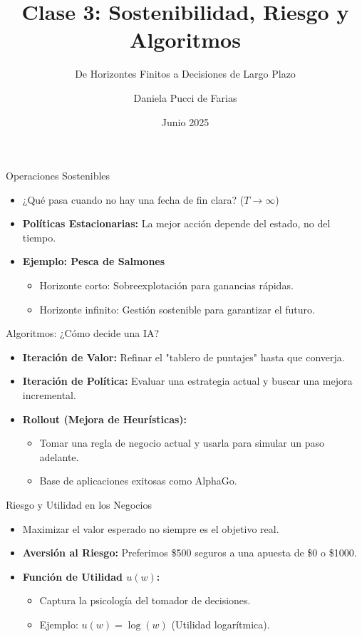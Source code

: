 \documentclass[handout]{beamer}
\title{Clase 3: Sostenibilidad, Riesgo y Algoritmos}
\subtitle{De Horizontes Finitos a Decisiones de Largo Plazo}
\author{Daniela Pucci de Farias}
\institute{Universidad Torcuato Di Tella}
\date{Junio 2025}
\begin{document}
\frame{\titlepage}

\begin{frame}{Operaciones Sostenibles}
\begin{itemize}
    \item ¿Qué pasa cuando no hay una fecha de fin clara? ($T \rightarrow \infty$)
    \item \textbf{Políticas Estacionarias:} La mejor acción depende del estado, no del tiempo.
    \item \textbf{Ejemplo: Pesca de Salmones}
    \begin{itemize}
        \item Horizonte corto: Sobreexplotación para ganancias rápidas.
        \item Horizonte infinito: Gestión sostenible para garantizar el futuro.
    \end{itemize}
\end{itemize}
\end{frame}

\begin{frame}{Algoritmos: ¿Cómo decide una IA?}
\begin{itemize}
    \item \textbf{Iteración de Valor:} Refinar el "tablero de puntajes" hasta que converja.
    \item \textbf{Iteración de Política:} Evaluar una estrategia actual y buscar una mejora incremental.
    \item \textbf{Rollout (Mejora de Heurísticas):}
    \begin{itemize}
        \item Tomar una regla de negocio actual y usarla para simular un paso adelante.
        \item Base de aplicaciones exitosas como AlphaGo.
    \end{itemize}
\end{itemize}
\end{frame}

\begin{frame}{Riesgo y Utilidad en los Negocios}
\begin{itemize}
    \item Maximizar el valor esperado no siempre es el objetivo real.
    \item \textbf{Aversión al Riesgo:} Preferimos \$500 seguros a una apuesta de \$0 o \$1000.
    \item \textbf{Función de Utilidad $u(w)$:}
    \begin{itemize}
        \item Captura la psicología del tomador de decisiones.
        \item Ejemplo: $u(w) = \log(w)$ (Utilidad logarítmica).
    \end{itemize}
\end{itemize}
\end{frame}
\end{document}
